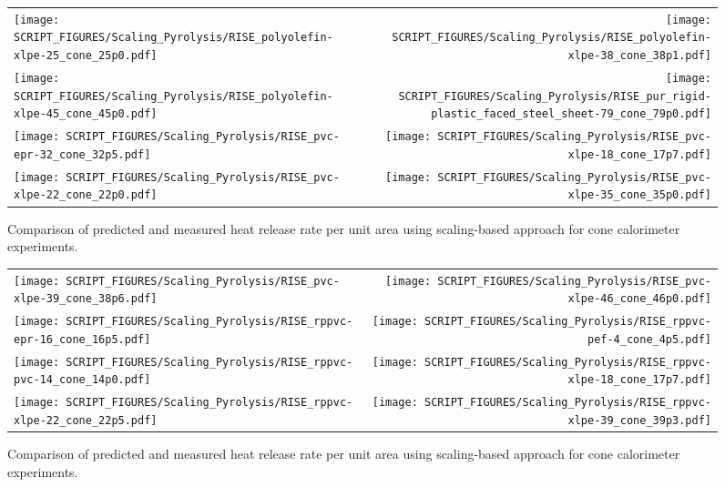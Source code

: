 \begin{figure}[p]
\begin{tabular*}{\textwidth}{l@{\extracolsep{\fill}}r}
\texttt{[image: SCRIPT\_FIGURES/Scaling\_Pyrolysis/RISE\_polyolefin-xlpe-25\_cone\_25p0.pdf]} &
\texttt{[image: SCRIPT\_FIGURES/Scaling\_Pyrolysis/RISE\_polyolefin-xlpe-38\_cone\_38p1.pdf]} \\
\texttt{[image: SCRIPT\_FIGURES/Scaling\_Pyrolysis/RISE\_polyolefin-xlpe-45\_cone\_45p0.pdf]} &
\texttt{[image: SCRIPT\_FIGURES/Scaling\_Pyrolysis/RISE\_pur\_rigid-plastic\_faced\_steel\_sheet-79\_cone\_79p0.pdf]} \\
\texttt{[image: SCRIPT\_FIGURES/Scaling\_Pyrolysis/RISE\_pvc-epr-32\_cone\_32p5.pdf]} &
\texttt{[image: SCRIPT\_FIGURES/Scaling\_Pyrolysis/RISE\_pvc-xlpe-18\_cone\_17p7.pdf]} \\
\texttt{[image: SCRIPT\_FIGURES/Scaling\_Pyrolysis/RISE\_pvc-xlpe-22\_cone\_22p0.pdf]} &
\texttt{[image: SCRIPT\_FIGURES/Scaling\_Pyrolysis/RISE\_pvc-xlpe-35\_cone\_35p0.pdf]} \\
\end{tabular*}
\caption[HRRPUA of RISE Materials using scaling model , Mixtures materials]
{Comparison of predicted and measured heat release rate per unit area using scaling-based approach for cone calorimeter experiments.}
\label{RISE_Materials_HRR_Mixtures}
\end{figure}

\begin{figure}[p]
\begin{tabular*}{\textwidth}{l@{\extracolsep{\fill}}r}
\texttt{[image: SCRIPT\_FIGURES/Scaling\_Pyrolysis/RISE\_pvc-xlpe-39\_cone\_38p6.pdf]} &
\texttt{[image: SCRIPT\_FIGURES/Scaling\_Pyrolysis/RISE\_pvc-xlpe-46\_cone\_46p0.pdf]} \\
\texttt{[image: SCRIPT\_FIGURES/Scaling\_Pyrolysis/RISE\_rppvc-epr-16\_cone\_16p5.pdf]} &
\texttt{[image: SCRIPT\_FIGURES/Scaling\_Pyrolysis/RISE\_rppvc-pef-4\_cone\_4p5.pdf]} \\
\texttt{[image: SCRIPT\_FIGURES/Scaling\_Pyrolysis/RISE\_rppvc-pvc-14\_cone\_14p0.pdf]} &
\texttt{[image: SCRIPT\_FIGURES/Scaling\_Pyrolysis/RISE\_rppvc-xlpe-18\_cone\_17p7.pdf]} \\
\texttt{[image: SCRIPT\_FIGURES/Scaling\_Pyrolysis/RISE\_rppvc-xlpe-22\_cone\_22p5.pdf]} &
\texttt{[image: SCRIPT\_FIGURES/Scaling\_Pyrolysis/RISE\_rppvc-xlpe-39\_cone\_39p3.pdf]} \\
\end{tabular*}
\caption[HRRPUA of RISE Materials using scaling model , Mixtures materials]
{Comparison of predicted and measured heat release rate per unit area using scaling-based approach for cone calorimeter experiments.}
\label{RISE_Materials_HRR_Mixtures}
\end{figure}

